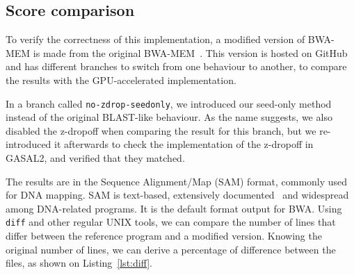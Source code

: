 \begin{algorithm}[h!]
\begin{algorithmic}[1]
		
		\EndFor %
		\EndFor %
			\State Store global score and global end position
		\EndIf
			\State Store new maximum score and new end position ($max\_query, max\_target$)
		}
			\If{the current score dropped more than $zdrop$ since the last maximum score}
				\State break
			\EndIf
		\EndIf
		
		\State Cell-skipping: $beg \leftarrow$ first cell of the stored row with non-zero score
		\State Cell-skipping: $end \leftarrow$ last cell of the stored row with non-zero score
		\EndFor %
		\EndFor %
		
		\State Find $i_{max}$ and $j_{max}$ for which $S_{i_{max}, j_{max}} = max(S_{i,j})$
		\State $score \leftarrow S_{i_{max}, j_{max}}$
		\State $end\_position\_query \leftarrow i_{max}$
		\State $end\_position\_target \leftarrow j_{max}$
		
		\EndProcedure
		
	\end{algorithmic}
\end{algorithm}


\subsection{Score comparison}

To verify the correctness of this implementation, a modified version of BWA-MEM is made from the original BWA-MEM~\cite{lh3:bwa}. This version is hosted on GitHub~\cite{j-levy:bwa} and has different branches to switch from one behaviour to another, to compare the results with the GPU-accelerated implementation.

In a branch called \verb|no-zdrop-seedonly|, we introduced our seed-only method instead of the original BLAST-like behaviour. As the name suggests, we also disabled the z-dropoff when comparing the result for this branch, but we re-introduced it afterwards to check the implementation of the z-dropoff in GASAL2, and verified that they matched.

The results are in the Sequence Alignment/Map (SAM) format, commonly used for DNA mapping. SAM is text-based, extensively documented~\cite{samtools:sam} and widespread among DNA-related programs. It is the default format output for BWA. Using \verb|diff| and other regular UNIX tools, we can compare the number of lines that differ between the reference program and a modified version. Knowing the original number of lines, we can derive a percentage of difference between the files, as shown on Listing~\ref{lst:diff}.

